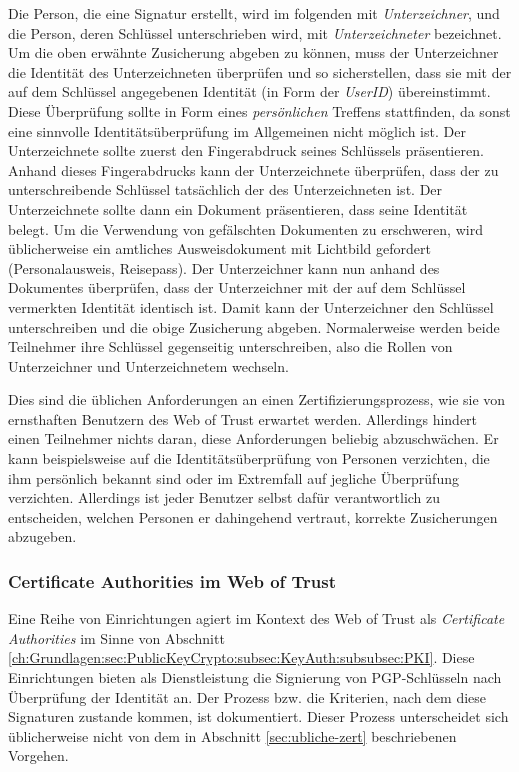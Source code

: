Die Person, die eine Signatur erstellt, wird im folgenden mit
\emph{Unterzeichner}, und die Person, deren Schl\"ussel
unterschrieben wird, mit \emph{Unterzeichneter} bezeichnet. Um
die oben erw\"ahnte Zusicherung abgeben zu k\"onnen, muss der
Unterzeichner die Identit\"at des Unterzeichneten \"uberpr\"ufen und
so sicherstellen, dass sie mit der auf dem Schl\"ussel angegebenen
Identit\"at (in Form der \emph{UserID}) \"ubereinstimmt. Diese
\"Uberpr\"ufung sollte in Form eines \emph{pers\"onlichen} Treffens
stattfinden, da sonst eine sinnvolle Identit\"ats\"uberpr\"ufung im
Allgemeinen nicht m\"oglich ist. Der Unterzeichnete sollte zuerst den
Fingerabdruck seines Schl\"ussels pr\"asentieren. Anhand dieses
Fingerabdrucks kann der Unterzeichnete \"uberpr\"ufen, dass der zu
unterschreibende Schl\"ussel tats\"achlich der des Unterzeichneten
ist.  Der Unterzeichnete sollte dann ein Dokument pr\"asentieren, dass
seine Identit\"at belegt. Um die Verwendung von gef\"alschten
Dokumenten zu erschweren, wird \"ublicherweise ein amtliches
Ausweisdokument mit Lichtbild gefordert (Personalausweis,
Reisepass). Der Unterzeichner kann nun anhand des Dokumentes
\"uberpr\"ufen, dass der Unterzeichner mit der auf dem Schl\"ussel
vermerkten Identit\"at identisch ist. Damit kann der Unterzeichner den
Schl\"ussel unterschreiben und die obige Zusicherung
abgeben. Normalerweise werden beide Teilnehmer ihre Schl\"ussel
gegenseitig unterschreiben, also die Rollen von Unterzeichner und
Unterzeichnetem wechseln.

Dies sind die \"ublichen Anforderungen an einen
Zertifizierungsprozess, wie sie von ernsthaften Benutzern des Web of
Trust erwartet werden. Allerdings hindert einen Teilnehmer nichts
daran, diese Anforderungen beliebig abzuschw\"achen. Er kann
beispielsweise auf die Identit\"ats\"uberpr\"ufung von Personen
verzichten, die ihm pers\"onlich bekannt sind oder im Extremfall auf
jegliche \"Uberpr\"ufung verzichten. Allerdings ist jeder Benutzer
selbst daf\"ur verantwortlich zu entscheiden, welchen Personen er
dahingehend vertraut, korrekte Zusicherungen abzugeben.

\subsubsection{Certificate Authorities im Web of Trust}
\label{sec:cert-auth-im}

Eine Reihe von Einrichtungen agiert im Kontext des Web of Trust als
\emph{Certificate Authorities} im Sinne von Abschnitt
\ref{ch:Grundlagen:sec:PublicKeyCrypto:subsec:KeyAuth:subsubsec:PKI}. Diese
Einrichtungen bieten als Dienstleistung die Signierung von
PGP-Schl\"usseln nach \"Uberpr\"ufung der Identit\"at an. Der Prozess
bzw. die Kriterien, nach dem diese Signaturen zustande kommen, ist
dokumentiert. Dieser Prozess unterscheidet sich \"ublicherweise nicht
von dem in Abschnitt \ref{sec:ubliche-zert} beschriebenen Vorgehen.

